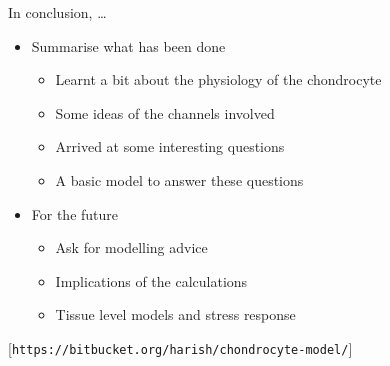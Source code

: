 \documentclass[ignorenonframetext]{beamer}
\newcommand{\references}[1] {
  \begin{flushright}
    \scriptsize [#1] \normalsize
  \end{flushright}
}
\begin{document}
\begin{frame}{In conclusion, \ldots}

  \begin{itemize}
  \item Summarise what has been done
    \begin{itemize}
      \item Learnt a bit about the physiology of the chondrocyte
      \item Some ideas of the channels involved
      \item Arrived at some interesting questions
      \item A basic model to answer these questions
    \end{itemize}
  \item For the future
    \begin{itemize}
    \item Ask for modelling advice
    \item Implications of the calculations
    \item Tissue level models and stress response
    \end{itemize}
  \end{itemize}

  \references{{\tt https://bitbucket.org/harish/chondrocyte-model/}}

\end{frame}
\end{document}
